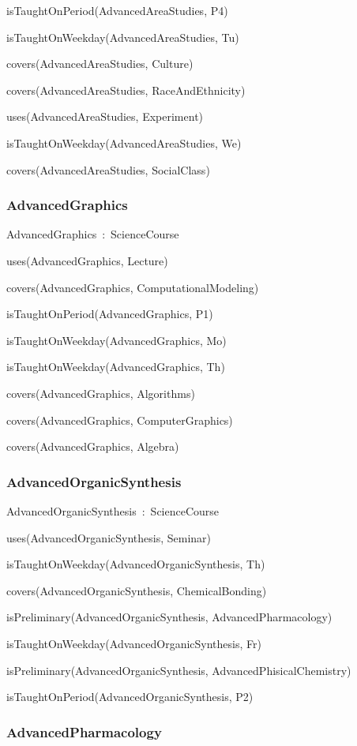 \documentclass{article}
\begin{document}
isTaughtOnPeriod(AdvancedAreaStudies, P4)

isTaughtOnWeekday(AdvancedAreaStudies, Tu)

covers(AdvancedAreaStudies, Culture)

covers(AdvancedAreaStudies, RaceAndEthnicity)

uses(AdvancedAreaStudies, Experiment)

isTaughtOnWeekday(AdvancedAreaStudies, We)

covers(AdvancedAreaStudies, SocialClass)

\subsubsection*{AdvancedGraphics}

AdvancedGraphics~:~ScienceCourse

uses(AdvancedGraphics, Lecture)

covers(AdvancedGraphics, ComputationalModeling)

isTaughtOnPeriod(AdvancedGraphics, P1)

isTaughtOnWeekday(AdvancedGraphics, Mo)

isTaughtOnWeekday(AdvancedGraphics, Th)

covers(AdvancedGraphics, Algorithms)

covers(AdvancedGraphics, ComputerGraphics)

covers(AdvancedGraphics, Algebra)

\subsubsection*{AdvancedOrganicSynthesis}

AdvancedOrganicSynthesis~:~ScienceCourse

uses(AdvancedOrganicSynthesis, Seminar)

isTaughtOnWeekday(AdvancedOrganicSynthesis, Th)

covers(AdvancedOrganicSynthesis, ChemicalBonding)

isPreliminary(AdvancedOrganicSynthesis, AdvancedPharmacology)

isTaughtOnWeekday(AdvancedOrganicSynthesis, Fr)

isPreliminary(AdvancedOrganicSynthesis, AdvancedPhisicalChemistry)

isTaughtOnPeriod(AdvancedOrganicSynthesis, P2)

\subsubsection*{AdvancedPharmacology}
\end{document}
